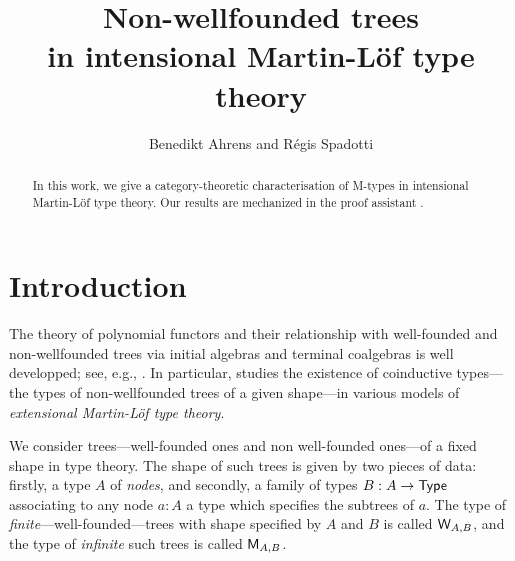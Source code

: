 \documentclass[envcountsame]{llncs}
\begin{document}
\title{Non-wellfounded trees\\in intensional Martin-L\"of type theory}

\author{Benedikt Ahrens and R\'egis Spadotti}


\newcommand{\fat}[1]{\textbf{#1}}
\newcommand{\M}{\constfont{M}}
\newcommand{\W}{\constfont{W}}
\renewcommand{\root}{\constfont{root}}
\newcommand{\br}{\constfont{br}}
\newcommand{\transport}{\constfont{transport}}


\maketitle


\begin{abstract}


 In this work, we give a category-theoretic characterisation of \textsf{M}-types in intensional Martin-L\"of type theory.
 Our results are mechanized in the proof assistant \coq.
   
  
  \end{abstract}


\section{Introduction}

The theory of polynomial functors and their relationship with well-founded and non-wellfounded trees via initial algebras and terminal coalgebras is
well developped; see, e.g., \parencite{jacobs1997tutorial, DBLP:journals/apal/MoerdijkP00, DBLP:journals/apal/BergM07}.
In particular, \textcite{DBLP:conf/calco/Marchi05} studies the existence of coinductive types---the types of non-wellfounded trees of a given shape---in
various models of \emph{extensional Martin-L\"of type theory}.



We consider trees---well-founded ones and non well-founded ones---of a fixed shape in type theory.
The shape of such trees is given by two pieces of data: firstly, a type $A$ of \emph{nodes}, and secondly,
a family of types $B : A \to \mathsf{Type}$ associating to any node $a : A$ a type which specifies the subtrees of $a$.
The type of \emph{finite}---well-founded---trees with shape specified by $A$ and $B$ is called $\W_{A,B}$,
and the type of \emph{infinite} such trees is called $\M_{A,B}$. 
\end{document}
